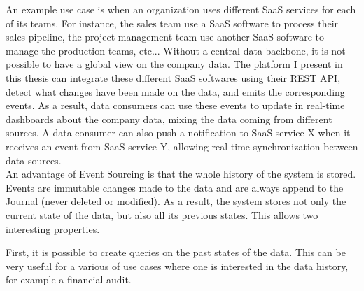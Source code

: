 An example use case is when an organization uses different SaaS services for each of its teams. For instance, the sales
team use a SaaS software to process their sales pipeline, the project management team use another SaaS software to manage
the production teams, etc... Without a central data backbone, it is not possible to have a global view on the company data.
The platform I present in this thesis can integrate these different SaaS softwares using their REST API, detect what
changes have been made on the data, and emits the corresponding events. As a result, data consumers can use these events
to update in real-time dashboards about the company data, mixing the data coming from different sources. A data consumer can also push a
notification to SaaS service X when it receives an event from SaaS service Y, allowing real-time synchronization between
data sources.
\\

An advantage of Event Sourcing is that the whole history of the system is stored. Events are immutable changes made to the data
and are always append to the Journal (never deleted or modified). As a result, the system stores not only the current state
of the data, but also all its previous states. This allows two interesting properties.

First, it is possible to create queries on the past states of the data. This can be very useful for a various of use cases
where one is interested in the data history, for example a financial audit.

